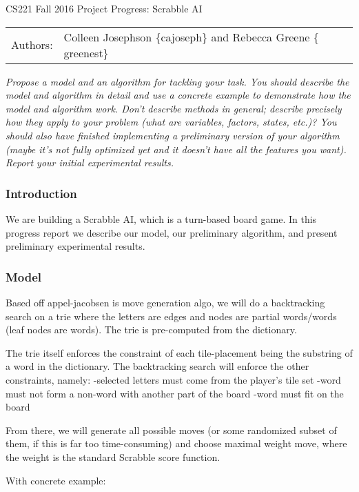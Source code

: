 \documentclass[12pt]{article}
\begin{document}
\begin{center}
{\Large CS221 Fall 2016 Project Progress: Scrabble AI}

\begin{tabular}{rl}
  Authors: & Colleen Josephson $\{$cajoseph$\}$ and Rebecca Greene $\{$greenest$\}$\\
\end{tabular}
\end{center}

\emph{Propose a model and an algorithm for tackling your task. You should
describe the model and algorithm in detail and use a concrete example
to demonstrate how the model and algorithm work. Don't describe
methods in general; describe precisely how they apply to your problem
(what are variables, factors, states, etc.)? You should also have
finished implementing a preliminary version of your algorithm (maybe
it's not fully optimized yet and it doesn't have all the features you
want). Report your initial experimental results.}


\subsubsection*{Introduction}
We are building a Scrabble AI, which is a turn-based board game. In
this progress report we describe our model, our preliminary algorithm,
and present preliminary experimental results.

\subsubsection*{Model}
Based off appel-jacobsen is move generation algo, we will do a
backtracking search on a trie where the letters are edges and nodes
are partial words/words (leaf nodes are words). The trie is
pre-computed from the dictionary.

The trie itself enforces the constraint of each tile-placement being
the substring of a word in the dictionary. The backtracking search
will enforce the other constraints, namely:
-selected letters must come from the player's tile set
-word must not form a non-word with another part of the board
-word must fit on the board

From there, we will generate all possible moves (or some randomized
subset of them, if this is far too time-consuming) and choose maximal
weight move, where the weight is the standard Scrabble score function.

With concrete example:
\end{document}
